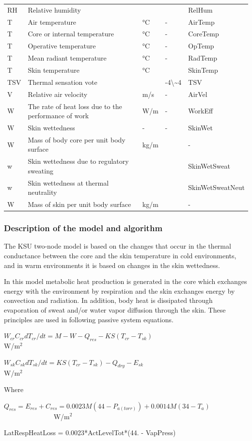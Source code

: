 \begin{longtable}[c]{p{1.2in}p{1.2in}p{1.2in}p{1.2in}p{1.2in}}
RH & Relative humidity & ~ & ~ & RelHum \tabularnewline
T & Air temperature & °C & - & AirTemp \tabularnewline
T & Core or internal temperature & °C & - & CoreTemp \tabularnewline
T & Operative temperature & °C & - & OpTemp \tabularnewline
T & Mean radiant temperature & °C & - & RadTemp \tabularnewline
T & Skin temperature & °C & ~ & SkinTemp \tabularnewline
TSV & Thermal sensation vote & ~ & -4\textbackslash\~{}4 & TSV \tabularnewline
V & Relative air velocity & m/s & - & AirVel \tabularnewline
W & The rate of heat loss due to the performance of work & W/m & - & WorkEff \tabularnewline
W & Skin wettedness & - & - & SkinWet \tabularnewline
W & Mass of body core per unit body surface & kg/m & ~ & - \tabularnewline
w & Skin wettedness due to regulatory sweating & ~ & ~ & SkinWetSweat \tabularnewline
w & Skin wettedness at thermal neutrality & ~ & ~ & SkinWetSweatNeut \tabularnewline
W & Mass of skin per unit body surface & kg/m & ~ & - \tabularnewline
\bottomrule
\end{longtable}

\subsubsection{Description of the model and algorithm}\label{description-of-the-model-and-algorithm-2}

The KSU two-node model is based on the changes that occur in the thermal conductance between the core and the skin temperature in cold environments, and in warm environments it is based on changes in the skin wettedness.

In this model metabolic heat production is generated in the core which exchanges energy with the environment by respiration and the skin exchanges energy by convection and radiation. In addition, body heat is dissipated through evaporation of sweat and/or water vapor diffusion through the skin. These principles are used in following passive system equations.

\({W_{cr}}{C_{cr}}d{T_{cr}}/dt = M - W - {Q_{res}} - KS({T_{cr}} - {T_{sk}})\) ~~~~~~~~~~~~~~~~~~~~~~~~ W/m\(^{2}\)

\({W_{sk}}{C_{sk}}d{T_{sk}}/dt = KS({T_{cr}} - {T_{sk}}) - {Q_{dry}} - {E_{sk}}\) ~~~~~~~~~~~~~~~~~~~~~~~~~~~~~~ W/m\(^{2}\)

Where

\({Q_{res}} = {E_{res}} + {C_{res}} = 0.0023M(44 - {P_{a(torr)}}) + 0.0014M(34 - {T_a})\) ~~~~~~~~~~~~~~ W/m\(^{2}\)

LatRespHeatLoss = 0.0023*ActLevelTot*(44. - VapPress)

